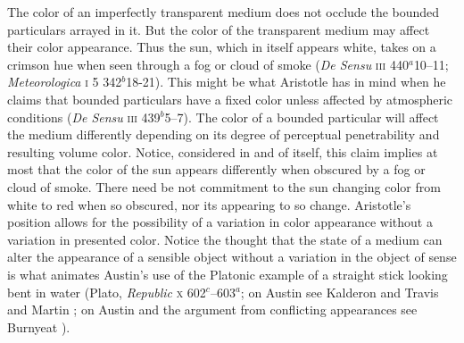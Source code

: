The color of an imperfectly transparent medium does not occlude the bound\-ed particulars arrayed in it. But the color of the transparent medium may affect their color appearance. Thus the sun, which in itself appears white, takes on a crimson hue when seen through a fog or cloud of smoke (\emph{De Sensu} \textsc{iii} 440\( ^{a} \)10--11; \emph{Meteorologica} \textsc{i} 5 342\( ^{b} \)18-21). This might be what Aristotle has in mind when he claims that bounded particulars have a fixed color unless affected by atmospheric conditions (\emph{De Sensu} \textsc{iii} 439\( ^{b} \)5--7). The color of a bounded particular will affect the medium differently depending on its degree of perceptual penetrability and resulting volume color. Notice, considered in and of itself, this claim implies at most that the color of the sun appears differently when obscured by a fog or cloud of smoke. There need be not commitment to the sun changing color from white to red when so obscured, nor its appearing to so change. Aristotle's position allows for the possibility of a variation in color appearance without a variation in presented color. Notice the thought that the state of a medium can alter the appearance of a sensible object without a variation in the object of sense is what animates Austin's \citeyearpar{Austin:1962lr} use of the Platonic example of a straight stick looking bent in water (Plato, \emph{Republic} \textsc{x} 602\( ^{c} \)--603\( ^{a} \); on Austin see Kalderon and Travis \citeyear{Kalderon:2010fk} and Martin \citeyear{Martin:2000nx}; on Austin and the argument from conflicting appearances see Burnyeat \citeyear{Burnyeat:1979mv}).


